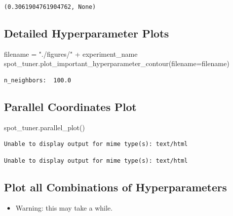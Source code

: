 \documentclass[
  letterpaper,
  DIV=11,
  numbers=noendperiod]{scrreprt}
\newenvironment{Shaded}{\begin{snugshade}}{\end{snugshade}}
\newcommand{\NormalTok}[1]{\textcolor[rgb]{0.00,0.23,0.31}{#1}}
\newcommand{\OperatorTok}[1]{\textcolor[rgb]{0.37,0.37,0.37}{#1}}
\newcommand{\StringTok}[1]{\textcolor[rgb]{0.13,0.47,0.30}{#1}}
\providecommand{\tightlist}{%
  \setlength{\itemsep}{0pt}\setlength{\parskip}{0pt}}\usepackage{longtable,booktabs,array}
\begin{document}
\begin{verbatim}
(0.3061904761904762, None)
\end{verbatim}

\hypertarget{detailed-hyperparameter-plots-6}{%
\subsection{Detailed Hyperparameter
Plots}\label{detailed-hyperparameter-plots-6}}

\begin{Shaded}
\begin{Highlighting}[]
\NormalTok{filename }\OperatorTok{=} \StringTok{"./figures/"} \OperatorTok{+}\NormalTok{ experiment\_name}
\NormalTok{spot\_tuner.plot\_important\_hyperparameter\_contour(filename}\OperatorTok{=}\NormalTok{filename)}
\end{Highlighting}
\end{Shaded}

\begin{verbatim}
n_neighbors:  100.0
\end{verbatim}

\hypertarget{parallel-coordinates-plot-4}{%
\subsection{Parallel Coordinates
Plot}\label{parallel-coordinates-plot-4}}

\begin{Shaded}
\begin{Highlighting}[]
\NormalTok{spot\_tuner.parallel\_plot()}
\end{Highlighting}
\end{Shaded}

\begin{verbatim}
Unable to display output for mime type(s): text/html
\end{verbatim}

\begin{verbatim}
Unable to display output for mime type(s): text/html
\end{verbatim}

\hypertarget{plot-all-combinations-of-hyperparameters-5}{%
\subsection{Plot all Combinations of
Hyperparameters}\label{plot-all-combinations-of-hyperparameters-5}}

\begin{itemize}
\tightlist
\item
  Warning: this may take a while.
\end{itemize}
\end{document}
